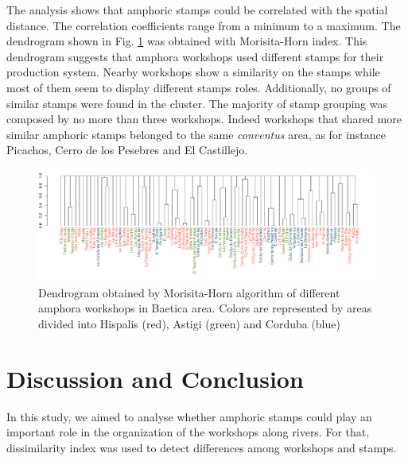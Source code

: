 \documentclass[review]{elsarticle}
\begin{document}
The analysis shows that amphoric stamps could be correlated with the spatial distance. The correlation coefficients range from a minimum to a maximum. The dendrogram shown in Fig. \ref{dendro} was obtained with Morisita-Horn index. This dendrogram suggests that amphora workshops used different stamps for their production system. Nearby workshops show a similarity on the stamps while most of them seem to display different stamps roles. Additionally, no groups of similar stamps were found in the cluster. The majority of stamp grouping was composed by no more than three workshops. Indeed workshops that shared more similar amphoric stamps belonged to the same \textit{conventus} area, as for instance Picachos, Cerro de los Pesebres and El Castillejo. 

\begin{figure}[htp]
	\centering
\includegraphics[width=\linewidth]{figs/dendro}
\caption{Dendrogram obtained by Morisita-Horn algorithm of different amphora workshops in Baetica area. Colors are represented by areas divided into Hispalis (red), Astigi (green) and Corduba (blue)}
\label{dendro}
\end{figure} 




\section{Discussion and Conclusion}


In this study, we aimed to analyse whether amphoric stamps could play an important role in the organization of the workshops along rivers. For that, dissimilarity index was used to detect differences among workshops and stamps. 
\end{document}

